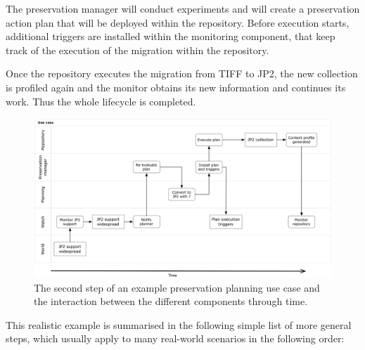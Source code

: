 The preservation manager will conduct experiments and will create a preservation action plan that will be deployed within the repository. Before execution starts, additional triggers are installed within the monitoring component, that keep track of the execution of the migration within the repository.

Once the repository executes the migration from TIFF to JP2, the new collection is profiled again and the monitor obtains its new information and continues its work. Thus the whole lifecycle is completed.

\begin{figure}[th]
\begin{center}
\includegraphics[width=6in]{figures/related/swimlane_step2.png}
\caption{The second step of an example preservation planning use case and the interaction between the different components through time.}
\label{fig:swimlane_step2}
\end{center}
\end{figure}

This realistic example is summarised in the following simple list of more general steps, which usually apply to many real-world scenarios in the following order:

